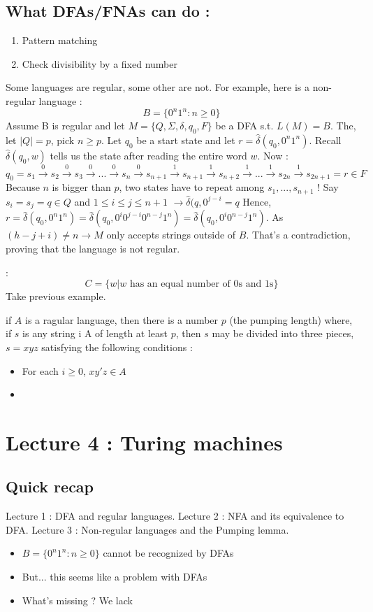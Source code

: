 \documentclass[12pt,a4paper]{article}
\newcommand{\<}{\langle}
\renewcommand{\>}{\rangle}
\begin{document}
\subsection{What DFAs/FNAs can do :}
\begin{enumerate}
    \item     Pattern matching
    \item     Check divisibility by a fixed number
\end{enumerate}
Some languages are regular, some other are not. For example, here is a non-regular language :
\[B = \{0^n1^n: n \geq 0\}\]
Assume B is regular and let $M = \{Q, \Sigma, \delta, q_0, F\}$  be a DFA s.t. $L(M) = B$. The, let $|Q| = p$, pick $n \geq p$. Let $q_0$ be a start state and let $r = \hat{\delta}(q_0, 0^n1^n)$. Recall $\hat{\delta}(q_0, w)$ tells us the state after reading the entire word $w$. Now :
\[q_0 = s_1 \overset{0}{\to} s_2 \overset{0}{\to} s_3 \overset{0}{\to}... \overset{0}{\to} s_n \overset{0}{\to}s_{n+1} \overset{1}{\to} s_{n+1} \overset{1}{\to} s_{n+2} \overset{1}{\to} ... \overset{1}{\to} s_{2n} \overset{1}{\to} s_{2n+1} = r \in F\]
Because $n$ is bigger than $p$, two states have to repeat among $s_1,...,s_{n+1}$ ! Say $s_i = s_j = q \in Q$ and $1 \leq i \leq j \leq n+1$ $\to \hat{\delta}(q, 0^{j-i} = q$ Hence, $r = \hat{\delta}(q_0, 0^n1^n) = \hat{\delta}(q_0,0^i0^{j-i}0^{n-j}1^n) = \hat{\delta}(q_0,0^i0^{n-j}1^n)$. As $(h-j+i) \neq n \to M$ only accepts strings outside of $B$. That's a contradiction, proving that the language is not regular.

 :
\[C = \{w|w \text{ has an equal number of 0s and 1s}\}\]
Take previous example.

 if $A$ is a ragular language, then there is a number $p$ (the pumping length) where, if $s$ is any string i A of length at least $p$, then $s$ may be divided into three pieces, $s = xyz$ satisfying the following conditions :
\begin{itemize}
    \item     For each $i \geq 0$, $xy'z \in A$
    \item     {}
\end{itemize}
\section{Lecture 4 : Turing machines}
\subsection{Quick recap}
Lecture 1 : DFA and regular languages. Lecture 2 : NFA and its equivalence to DFA. Lecture 3 : Non-regular languages and the Pumping lemma.
\begin{itemize}
    \item     $B = \{0^n1^n: n \geq 0\}$ cannot be recognized by DFAs
    \item     But... this seems like a problem with DFAs
    \item     What's missing ? We lack 
\end{itemize}
\end{document}
